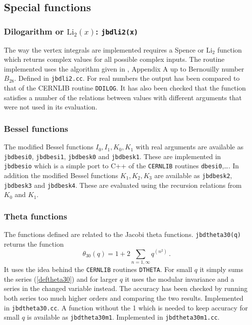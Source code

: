 \documentclass[12pt,a4paper]{article}
\begin{document}
\subsection{Special functions}

\subsubsection{Dilogarithm or $\mathrm{Li}_2(x)$: \texttt{jbdli2(x)}}

The way the vertex integrals are implemented requires a Spence or
$\mathrm{Li}_2$
function which returns complex values for all possible complex inputs.
The routine implemented uses the algorithm given in \cite{'tHooft:1978xw},
Appendix A
up to Bernouilly number $B_{28}$. Defined in \texttt{jbdli2.cc}.
For real numbers the output has been compared to that of the
\textsc{CERNLIB} routine \texttt{DDILOG}.
It has also been checked that the function satisfies a number of the
relations between values with different arguments that were not used in
its evaluation.

\subsubsection{Bessel functions}

The modified Bessel functions $I_0,I_1,K_0,K_1$ with real
arguments are available as \texttt{jbdbesi0}, \texttt{jbdbesi1}, 
 \texttt{jbdbesk0} and \texttt{jbdbesk1}. These are implemented in
\texttt{jbdbesio} which is a simple port to \textsc{C++} of the
\texttt{CERNLIB} routines \texttt{dbesi0},\ldots.
In addition the modified Bessel functions $K_1,K_2,K_3$
are available as  \texttt{jbdbesk2},  \texttt{jbdbesk3}
and \texttt{jbdbesk4}. These are evaluated using the recursion relations
from $K_0$ and $K_1$.

\subsubsection{Theta functions}

The functions defined are related to the Jacobi theta functions.
\texttt{jbdtheta30(q)} returns the function
\begin{equation}
\label{deftheta30}
\theta_{30}(q) = 1+2\sum_{n=1,\infty} q^{(n^2)}\,.
\end{equation}
It uses the idea behind the \texttt{CERNLIB} routines \texttt{DTHETA}.
For small $q$ it simply sums the series (\ref{deftheta30}) and for
larger $q$ it uses the modular invariance and a series in the changed variable
instead. The accuracy has been checked by running both series too much higher
orders and comparing the two results. Implemented in \texttt{jbdtheta30.cc}.
A function without the 1 which is needed to keep accuracy for small
$q$ is available as \texttt{jbdtheta30m1}. 
Implemented in \texttt{jbdtheta30m1.cc}.
\end{document}
